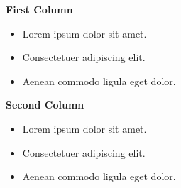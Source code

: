 \begin{minipage}{0.45\textwidth}
  {\bf First Column}
  \footnotesize
  \begin{itemize}
    \item Lorem ipsum dolor sit amet.
    \item Consectetuer adipiscing elit.
    \item Aenean commodo ligula eget dolor.
  \end{itemize}
\end{minipage}
\pause
\begin{minipage}{0.45\textwidth}
  {\bf Second Column}
  \footnotesize
  \begin{itemize}
    \item Lorem ipsum dolor sit amet.
    \item Consectetuer adipiscing elit.
    \item Aenean commodo ligula eget dolor.
  \end{itemize}
\end{minipage}

